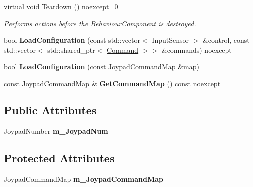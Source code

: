 \begin{DoxyCompactItemize}
virtual void \hyperlink{class_blade_1_1_joypad_input_component_ab5009626ea7dd18b3713b4e3ee8fa650}{Teardown} () noexcept=0
\begin{DoxyCompactList}\small\item\em Performs actions before the \hyperlink{class_blade_1_1_behaviour_component}{Behaviour\+Component} is destroyed. \end{DoxyCompactList}\item 
\mbox{\label{class_blade_1_1_joypad_input_component_aa72a4910f2db050a9d25051e1482b812}} 
bool {\bfseries Load\+Configuration} (const std\+::vector$<$ Input\+Sensor $>$ \&control, const std\+::vector$<$ std\+::shared\+\_\+ptr$<$ \hyperlink{class_blade_1_1_command}{Command} $>$$>$ \&commands) noexcept
\item 
\mbox{\label{class_blade_1_1_joypad_input_component_a1829016a46492b0e1387db96b5b1ceb0}} 
bool {\bfseries Load\+Configuration} (const Joypad\+Command\+Map \&map)
\item 
\mbox{\label{class_blade_1_1_joypad_input_component_a0835408ffdcf5f6fb44f726f053a7152}} 
const Joypad\+Command\+Map \& {\bfseries Get\+Command\+Map} () const noexcept
\end{DoxyCompactItemize}
\subsection*{Public Attributes}
\begin{DoxyCompactItemize}
\item 
\mbox{\label{class_blade_1_1_joypad_input_component_ad67873042be4c780de3d2257ba2bd88b}} 
Joypad\+Number {\bfseries m\+\_\+\+Joypad\+Num}
\end{DoxyCompactItemize}
\subsection*{Protected Attributes}
\begin{DoxyCompactItemize}
\item 
\mbox{\label{class_blade_1_1_joypad_input_component_a17ae33415867c4d3128cfa28f30e46d2}} 
Joypad\+Command\+Map {\bfseries m\+\_\+\+Joypad\+Command\+Map}
\end{DoxyCompactItemize}


